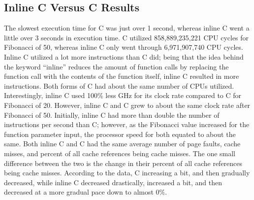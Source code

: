 \documentclass{sig-alternate}
\begin{document}
\subsection{Inline C Versus C Results}
The slowest execution time for C was just over 1 second, whereas inline C went a little over 3 seconds in execution time. C utilized 858,889,235,221 CPU cycles for Fibonacci of 50, whereas inline C only went through 6,971,907,740 CPU cycles. Inline C utilized a lot more instructions than C did; being that the idea behind the keyword “inline” reduces the amount of function calls by replacing the function call with the contents of the function itself, inline C resulted in more instructions. Both forms of C had about the same number of CPUs utilized. Interestingly, inline C used 100\% less GHz for its clock rate compared to C for Fibonacci of 20. However, inline C and C grew to about the same clock rate after Fibonacci of 50. Initially, inline C had more than double the number of instructions per second than C; however, as the Fibonacci value increased for the function parameter input, the processor speed for both equated to about the same. Both inline C and C had the same average number of page faults, cache misses, and percent of all cache references being cache misses. The one small difference between the two is the change in their percent of all cache references being cache misses. According to the data, C increasing a bit, and then gradually decreased, while inline C decreased drastically, increased a bit, and then decreased at a more gradual pace down to almost 0\%.
\end{document}
